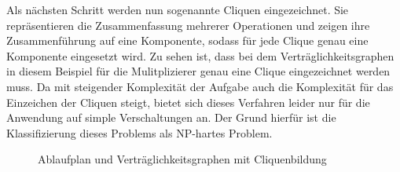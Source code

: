 \documentclass[conference]{IEEEtran}
\begin{document}
Als nächsten Schritt werden nun sogenannte Cliquen eingezeichnet. Sie repräsentieren die Zusammenfassung mehrerer Operationen und zeigen ihre Zusammenführung auf eine Komponente, sodass für jede Clique genau eine Komponente eingesetzt wird. Zu sehen ist, dass bei dem Verträglichkeitsgraphen in diesem Beispiel für die Mulitplizierer genau eine Clique eingezeichnet werden muss. Da mit steigender Komplexität der Aufgabe auch die Komplexität für das Einzeichen der Cliquen steigt, bietet sich dieses Verfahren leider nur für die Anwendung auf simple Verschaltungen an. Der Grund hierfür ist die Klassifizierung dieses Problems als NP-hartes Problem.\cite[S.361]{2}\\
\begin{figure}[h]
\caption{Ablaufplan und Verträglichkeitsgraphen mit Cliquenbildung}
\label{fig.3}
\end{figure}


\end{document}
